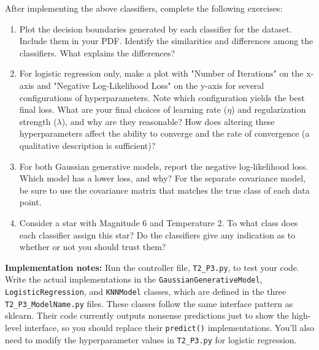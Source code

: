 \documentclass[submit]{harvardml}
\begin{document}
\begin{problem}
\begin{enumerate}[label=\alph*)]
\end{enumerate}

After implementing the above classifiers, complete the following exercises:

\begin{enumerate}
    \item Plot the decision boundaries generated by each classifier for the dataset. Include them in your PDF. 
    Identify the similarities and differences among the classifiers. What explains the differences?
    
    \item For logistic regression only, make a plot with
      "Number of Iterations" on the x-axis and "Negative Log-Likelihood Loss" on the y-axis for several
      configurations of hyperparameters. Note which configuration yields
      the best final loss. What are your final choices of learning rate
      ($\eta$) and regularization strength ($\lambda$), and why are they reasonable? How
      does altering these hyperparameters affect the ability to converge and the rate of convergence (a
      qualitative description is sufficient)?

    \item For both Gaussian generative models, report the negative log-likelihood loss. Which model has a lower loss, and why?
      For the separate covariance model, be sure to use
      the covariance matrix that matches the true class of each data
      point.
    
    \item Consider a star with Magnitude 6 and Temperature 2.
      To what class does each classifier assign this star? Do the
      classifiers give any indication as to whether or not you should
  trust them?
\end{enumerate}

\textbf{Implementation notes:} Run the controller file, \texttt{T2\_P3.py},
to test your code. Write the actual implementations in the \texttt{GaussianGenerativeModel},
\texttt{LogisticRegression}, and \texttt{KNNModel} classes, which are defined in the three
\texttt{T2\_P3\_ModelName.py} files. These classes follow the same interface pattern
as sklearn. Their code
currently outputs nonsense predictions just to show the
high-level interface, so you should replace their \texttt{predict()} implementations.
You'll also need to modify the hyperparameter
values in \texttt{T2\_P3.py} for logistic regression.

\end{problem}
\end{document}
